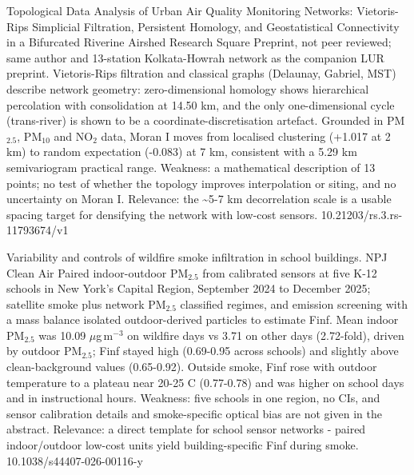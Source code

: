 \documentclass[10pt]{article}
\begin{document}
\par{}\baselineskip{}\baselineskip
{}

{Topological Data Analysis of Urban Air Quality Monitoring Networks: Vietoris-Rips Simplicial Filtration, Persistent Homology, and Geostatistical Connectivity in a Bifurcated Riverine Airshed}
{Research Square}
{Preprint, not peer reviewed; same author and 13-station Kolkata-Howrah network as the companion LUR preprint. Vietoris-Rips filtration and classical graphs (Delaunay, Gabriel, MST) describe network geometry: zero-dimensional homology shows hierarchical percolation with consolidation at 14.50 km, and the only one-dimensional cycle (trans-river) is shown to be a coordinate-discretisation artefact. Grounded in PM$_{2.5}$, PM$_{10}$ and NO$_2$ data, Moran I moves from localised clustering (+1.017 at 2 km) to random expectation (-0.083) at 7 km, consistent with a 5.29 km semivariogram practical range. Weakness: a mathematical description of 13 points; no test of whether the topology improves interpolation or siting, and no uncertainty on Moran I. Relevance: the \textasciitilde{}5-7 km decorrelation scale is a usable spacing target for densifying the network with low-cost sensors.}
{10.21203/rs.3.rs-11793674/v1}

\par{}\baselineskip{}\baselineskip
{}

{Variability and controls of wildfire smoke infiltration in school buildings.}
{NPJ Clean Air}
{Paired indoor-outdoor PM$_{2.5}$ from calibrated sensors at five K-12 schools in New York's Capital Region, September 2024 to December 2025; satellite smoke plus network PM$_{2.5}$ classified regimes, and emission screening with a mass balance isolated outdoor-derived particles to estimate Finf. Mean indoor PM$_{2.5}$ was 10.09 $\mu$g\,m$^{-3}$ on wildfire days vs 3.71 on other days (2.72-fold), driven by outdoor PM$_{2.5}$; Finf stayed high (0.69-0.95 across schools) and slightly above clean-background values (0.65-0.92). Outside smoke, Finf rose with outdoor temperature to a plateau near 20-25 C (0.77-0.78) and was higher on school days and in instructional hours. Weakness: five schools in one region, no CIs, and sensor calibration details and smoke-specific optical bias are not given in the abstract. Relevance: a direct template for school sensor networks - paired indoor/outdoor low-cost units yield building-specific Finf during smoke.}
{10.1038/s44407-026-00116-y}
\end{document}
